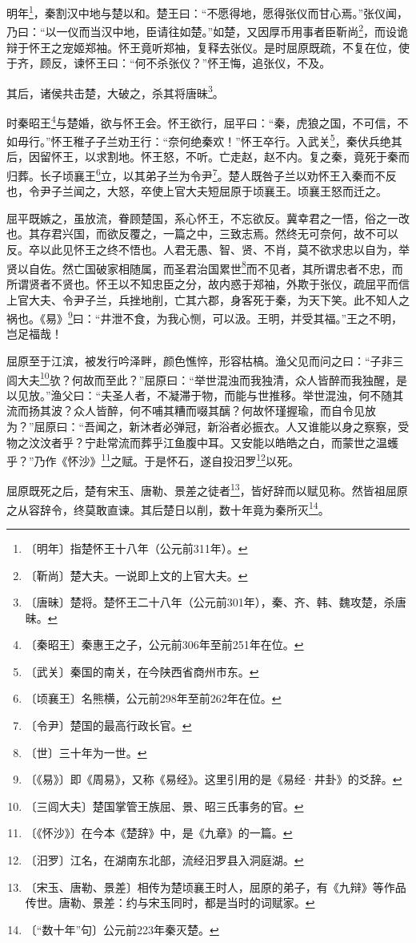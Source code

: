 \documentclass[12pt,UTF-8,openany]{ctexbook}
\begin{document}
\begin{normalsize}
    明年\footnote{〔明年〕指楚怀王十八年（公元前311年）。}，秦割汉中地与楚以和。楚王曰：“不愿得地，愿得张仪而甘心焉。”张仪闻，乃曰：“以一仪而当汉中地，臣请往如楚。”如楚，又因厚币用事者臣靳尚\footnote{〔靳尚〕楚大夫。一说即上文的上官大夫。}，而设诡辩于怀王之宠姬郑袖。怀王竟听郑袖，复释去张仪。是时屈原既疏，不复在位，使于齐，顾反，谏怀王曰：“何不杀张仪？”怀王悔，追张仪，不及。
    
    其后，诸侯共击楚，大破之，杀其将唐昧\footnote{〔唐昧〕楚将。楚怀王二十八年（公元前301年），秦、齐、韩、魏攻楚，杀唐昧。}。
    
    时秦昭王\footnote{〔秦昭王〕秦惠王之子，公元前306年至前251年在位。}与楚婚，欲与怀王会。怀王欲行，屈平曰：“秦，虎狼之国，不可信，不如毋行。”怀王稚子子兰劝王行：“奈何绝秦欢！”怀王卒行。入武关\footnote{〔武关〕秦国的南关，在今陕西省商州市东。}，秦伏兵绝其后，因留怀王，以求割地。怀王怒，不听。亡走赵，赵不内。复之秦，竟死于秦而归葬。长子顷襄王\footnote{〔顷襄王〕名熊横，公元前298年至前262年在位。}立，以其弟子兰为令尹\footnote{〔令尹〕楚国的最高行政长官。}。楚人既咎子兰以劝怀王入秦而不反也，令尹子兰闻之，大怒，卒使上官大夫短屈原于顷襄王。顷襄王怒而迁之。
    
    屈平既嫉之，虽放流，眷顾楚国，系心怀王，不忘欲反。冀幸君之一悟，俗之一改也。其存君兴国，而欲反覆之，一篇之中，三致志焉。然终无可奈何，故不可以反。卒以此见怀王之终不悟也。人君无愚、智、贤、不肖，莫不欲求忠以自为，举贤以自佐。然亡国破家相随属，而圣君治国累世\footnote{〔世〕三十年为一世。}而不见者，其所谓忠者不忠，而所谓贤者不贤也。怀王以不知忠臣之分，故内惑于郑袖，外欺于张仪，疏屈平而信上官大夫、令尹子兰，兵挫地削，亡其六郡，身客死于秦，为天下笑。此不知人之祸也。《易》\footnote{〔《易》〕即《周易》，又称《易经》。这里引用的是《易经·井卦》的爻辞。}曰：“井泄不食，为我心恻，可以汲。王明，并受其福。”王之不明，岂足福哉！
    
    屈原至于江滨，被发行吟泽畔，颜色憔悴，形容枯槁。渔父见而问之曰：“子非三闾大夫\footnote{〔三闾大夫〕楚国掌管王族屈、景、昭三氏事务的官。}欤？何故而至此？”屈原曰：“举世混浊而我独清，众人皆醉而我独醒，是以见放。”渔父曰：“夫圣人者，不凝滞于物，而能与世推移。举世混浊，何不随其流而扬其波？众人皆醉，何不哺其糟而啜其醨？何故怀瑾握瑜，而自令见放为？”屈原曰：“吾闻之，新沐者必弹冠，新浴者必振衣。人又谁能以身之察察，受物之汶汶者乎？宁赴常流而葬乎江鱼腹中耳。又安能以皓皓之白，而蒙世之温蠖乎？”乃作《怀沙》\footnote{〔《怀沙》〕在今本《楚辞》中，是《九章》的一篇。}之赋。于是怀石，遂自投汨罗\footnote{〔汨罗〕江名，在湖南东北部，流经汨罗县入洞庭湖。}以死。
    
    屈原既死之后，楚有宋玉、唐勒、景差之徒者\footnote{〔宋玉、唐勒、景差〕相传为楚顷襄王时人，屈原的弟子，有《九辩》等作品传世。唐勒、景差：约与宋玉同时，都是当时的词赋家。}，皆好辞而以赋见称。然皆祖屈原之从容辞令，终莫敢直谏。其后楚日以削，数十年竟为秦所灭\footnote{〔“数十年”句〕公元前223年秦灭楚。}。
    

\end{normalsize}
\end{document}
